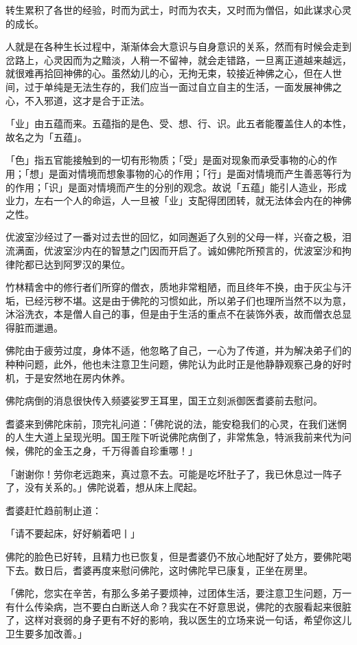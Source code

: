 \documentclass[12pt,twoside,openany]{book}
\begin{document}
转生累积了各世的经验，时而为武士，时而为农夫，又时而为僧侣，如此谋求心灵的成长。

人就是在各种生长过程中，渐渐体会大意识与自身意识的关系，然而有时候会走到岔路上，心灵因而为之黯淡，人稍一不留神，就会走错路，一旦离正道越来越远，就很难再拾回神佛的心。虽然幼儿的心，无拘无束，较接近神佛之心，但在人世间，过于单纯是无法生存的，我们应当一面过自立自主的生活，一面发展神佛之心，不入邪道，这才是合于正法。

「业」由五蕴而来。五蕴指的是色、受、想、行、识。此五者能覆盖住人的本性，故名之为「五蕴」。

「色」指五官能接触到的一切有形物质；「受」是面对现象而承受事物的心的作用；「想」是面对情境而想象事物的心的作用；「行」是面对情境而产生善恶等行为的作用；「识」是面对情境而产生的分别的观念。故说「五蕴」能引人造业，形成业力，左右一个人的命运，人一旦被「业」支配得团团转，就无法体会内在的神佛之性。

优波室沙经过了一番对过去世的回忆，如同邂逅了久别的父母一样，兴奋之极，泪流满面，优波室沙内在的智慧之门因而开启了。诚如佛陀所预言的，优波室沙和拘律陀都已达到阿罗汉的果位。

竹林精舍中的修行者们所穿的僧衣，质地非常粗陋，而且终年不换，由于灰尘与汗垢，已经污秽不堪。这是由于佛陀的习惯如此，所以弟子们也理所当然不以为意，沐浴洗衣，本是僧人自己的事，但是由于生活的重点不在装饰外表，故而僧衣总显得脏而邋遢。

佛陀由于疲劳过度，身体不适，他忽略了自己，一心为了传道，并为解决弟子们的种种问题，此外，他也未注意卫生问题，佛陀认为此时正是他静静观察己身的好时机，于是安然地在房内休养。

佛陀病倒的消息很快传入频婆娑罗王耳里，国王立刻派御医耆婆前去慰问。

耆婆来到佛陀床前，顶完礼问道：「佛陀说的法，能安稳我们的心灵，在我们迷惘的人生大道上呈现光明。国王陛下听说佛陀病倒了，非常焦急，特派我前来代为问候，佛陀的金玉之身，千万得善自珍重哪！」

「谢谢你！劳你老远跑来，真过意不去。可能是吃坏肚子了，我已休息过一阵子了，没有关系的。」佛陀说着，想从床上爬起。

耆婆赶忙趋前制止道：

「请不要起床，好好躺着吧丨」

佛陀的脸色已好转，且精力也已恢复，但是耆婆仍不放心地配好了处方，要佛陀喝下去。数日后，耆婆再度来慰问佛陀，这时佛陀早已康复，正坐在房里。

「佛陀，您实在辛苦，有那么多弟子要烦神，过团体生活，要注意卫生问题，万一有什么传染病，岂不要白白断送人命？我实在不好意思说，佛陀的衣服看起来很脏了，这样对衰弱的身子更有不好的影响，我以医生的立场来说一句话，希望你这儿卫生要多加改善。」
\end{document}

